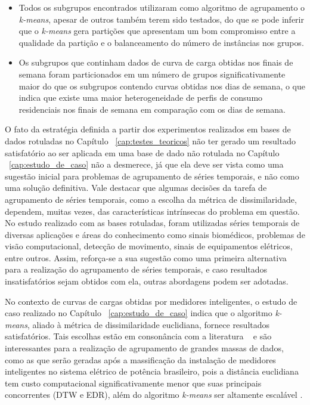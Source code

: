 \begin{itemize}
	\item Todos os subgrupos encontrados utilizaram como algoritmo de agrupamento o \emph{k-means}, apesar de outros também terem sido testados, do que se  pode inferir que o \emph{k-means} gera partições que apresentam um bom compromisso entre a qualidade da partição e o balanceamento do número de instâncias nos grupos.
	\item Os subgrupos que continham dados de curva de carga obtidas nos finais de semana foram particionados em um número de grupos significativamente maior do que os subgrupos contendo curvas obtidas nos dias de semana, o que indica que existe uma maior heterogeneidade de perfis de consumo residenciais nos finais de semana em comparação com os dias de semana.
\end{itemize}

O fato da estratégia definida a partir dos experimentos realizados em bases de dados rotuladas no Capítulo ~\ref{cap:testes_teoricos} não ter gerado um resultado satisfatório ao ser aplicada em uma base de dado não rotulada no Capítulo ~\ref{cap:estudo_de_caso} não a desmerece, já que ela deve ser vista como uma sugestão inicial para problemas de agrupamento de séries temporais, e não como uma solução definitiva. Vale destacar que algumas decisões da tarefa de agrupamento de séries temporais, como a escolha da métrica de dissimilaridade, dependem, muitas vezes, das características intrínsecas do problema em questão. No estudo realizado com as bases rotuladas, foram utilizadas séries temporais de diversas aplicações e áreas do conhecimento como sinais biomédicos, problemas de visão computacional, detecção de movimento, sinais de equipamentos elétricos, entre outros. Assim, reforça-se a sua sugestão como uma primeira alternativa para a realização do agrupamento de séries temporais, e caso resultados insatisfatórios sejam obtidos com ela, outras abordagens podem ser adotadas.

No contexto de curvas de cargas obtidas por medidores inteligentes, o estudo de caso realizado no Capítulo ~\ref{cap:estudo_de_caso} indica que o algoritmo \emph{k-means}, aliado à métrica de dissimilaridade euclidiana, fornece resultados satisfatórios. Tais escolhas estão em consonância com a literatura ~\parencite{Chicco} e são interessantes para a realização de agrupamento de grandes massas de dados, como as que serão geradas após a massificação da instalação de medidores inteligentes no sistema elétrico de potência brasileiro, pois a distância euclidiana tem custo computacional significativamente menor que suas principais concorrentes (DTW e EDR), além do algoritmo \emph{k-means} ser altamente escalável \parencite{zhao2009parallel, stoffel1999parallel, bahmani2012scalable}. 

